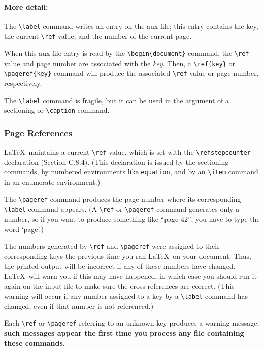 \documentclass{article}
\newcommand{\justtext}[1]{\texttt{\textbackslash #1}}
\begin{document}
\paragraph{More detail:} The \justtext{label} command writes an entry on the aux file; this entry
contains the key, the current \justtext{ref} value, and the number of the current page. 
 
When this aux file entry is read by the \justtext{begin\{document\}} command, 
the \justtext{ref} value and page number are associated with the \emph{key}. 
Then, a \justtext{ref\{key\}} or \justtext{pageref\{key\}} command will produce the associated 
\justtext{ref} value or page number, respectively.
 
The \justtext{label} command is fragile, but it can be used in the argument of a sectioning
or \justtext{caption} command.

\subsubsection{Page References}

\LaTeX\ maintains a current \justtext{ref} value, which is set with the \justtext{refstepcounter} 
declaration (Section C.8.4). (This declaration is issued by the sectioning commands, by numbered
environments like {\tt equation}, and by an \justtext{item} command in an enumerate environment.)

The \justtext{pageref} command produces the page number where its corresponding \justtext{label} 
command appears. (A \justtext{ref} or \justtext{pageref} command generates only a number, so if you 
want to produce something like ``page 42'', you have to type the word `page'.)

The numbers generated by \justtext{ref} and \justtext{pageref} were assigned to their corresponding
keys the previous time you ran \LaTeX\ on your document. Thus, the printed output will be incorrect
if any of these numbers have changed. \LaTeX\ will warn you if this may have happened, in which
case you should run it again on the input file to make sure the cross-references are correct.
(This warning will occur if any number assigned to a key by a \justtext{label} command has changed,
even if that number is not referenced.) 

Each \justtext{ref} or \justtext{pageref} referring to an unknown key produces a warning
message; \textbf{such messages appear the first time you process any file containing these
commands}.
\end{document}
